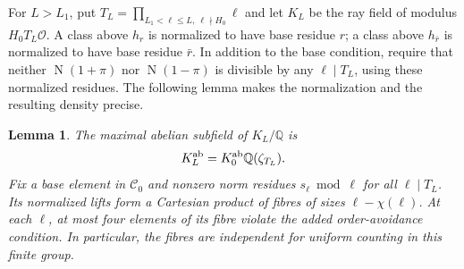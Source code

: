 \documentclass[11pt,reqno]{amsart}
\newtheorem{lemma}[theorem]{Lemma}
\theoremstyle{definition}
\numberwithin{equation}{section}
\newcommand{\Q}{\mathbb Q}
\newcommand{\Nm}{\operatorname{N}}
\begin{document}
For $L>L_1$, put $T_L=\prod_{L_1<\ell\le L,\ \ell\nmid H_0}\ell$ and let $K_L$ be the ray field of modulus $H_0T_L\mathcal O$. A class above $h_r$ is normalized to have base residue $r$; a class above $h_{\bar r}$ is normalized to have base residue $\bar r$. In addition to the base condition, require that neither $\Nm(1+\pi)$ nor $\Nm(1-\pi)$ is divisible by any $\ell\mid T_L$, using these normalized residues. The following lemma makes the normalization and the resulting density precise.

\begin{lemma}\label{an:lem:rayfibres}
The maximal abelian subfield of $K_L/\Q$ is
\[
 K_L^{\rm ab}=K_0^{\rm ab}\Q(\zeta_{T_L}).
\]
Fix a base element in $\mathcal C_0$ and nonzero norm residues $s_\ell\bmod\ell$ for all $\ell\mid T_L$. Its normalized lifts form a Cartesian product of fibres of sizes $\ell-\chi(\ell)$. At each $\ell$, at most four elements of its fibre violate the added order-avoidance condition. In particular, the fibres are independent for uniform counting in this finite group.
\end{lemma}
\end{document}
